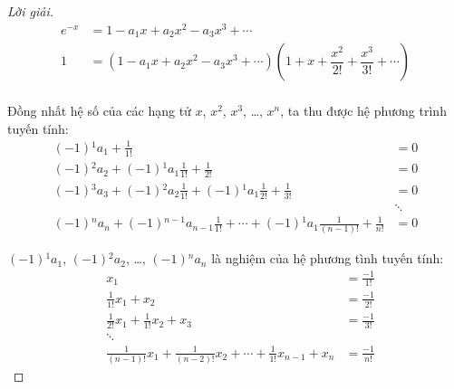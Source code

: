 \documentclass[class=nhvh-linear-algebra,crop=false]{standalone}
\begin{document}
\begin{proof}[Lời giải]
    \begingroup{}
    \allowdisplaybreaks{}
    \begin{align*}
        e^{-x} & = 1 - a_{1}x + a_{2}x^{2} - a_{3}x^{3} + \cdots                                                                      \\
        1      & = (1 - a_{1}x + a_{2}x^{2} - a_{3}x^{3} + \cdots)\left(1 + x + \dfrac{x^{2}}{2!} + \dfrac{x^{3}}{3!} + \cdots\right) \\
    \end{align*}
    \endgroup{}
    \par Đồng nhất hệ số của các hạng tử $x$, $x^{2}$, $x^{3}$, \ldots, $x^{n}$, ta thu được hệ phương trình tuyến tính:
    \begin{align*}
        (-1){}^{1}a_{1} + \frac{1}{1!}                                                                              & = 0    \\
        (-1){}^{2}a_{2} + (-1){}^{1}a_{1}\frac{1}{1!} + \frac{1}{2!}                                                & = 0    \\
        (-1){}^{3}a_{3} + (-1){}^{2}a_{2}\frac{1}{1!} + (-1){}^{1}a_{1}\frac{1}{2!} + \frac{1}{3!}                  & = 0    \\
                                                                                                                    & \ddots \\
        (-1){}^{n}a_{n} + (-1){}^{n-1}a_{n-1}\frac{1}{1!} + \cdots + (-1){}^{1}a_{1}\frac{1}{(n-1)!} + \frac{1}{n!} & = 0
    \end{align*}
    \par $(-1){}^{1}a_{1}$, $(-1){}^{2}a_{2}$, \ldots, $(-1){}^{n}a_{n}$ là nghiệm của hệ phương tình tuyến tính:
    \begin{align*}
         & x_{1}                                                                                & = \frac{-1}{1!} \\
         & \frac{1}{1!}x_{1} + x_{2}                                                            & = \frac{-1}{2!} \\
         & \frac{1}{2!}x_{1} + \frac{1}{1!}x_{2} + x_{3}                                        & = \frac{-1}{3!} \\
         & \ddots                                                                               &                 \\
         & \frac{1}{(n-1)!}x_{1} + \frac{1}{(n-2)!}x_{2} + \cdots + \frac{1}{1!}x_{n-1} + x_{n} & = \frac{-1}{n!}

\end{align*}
\end{proof}
\end{document}
